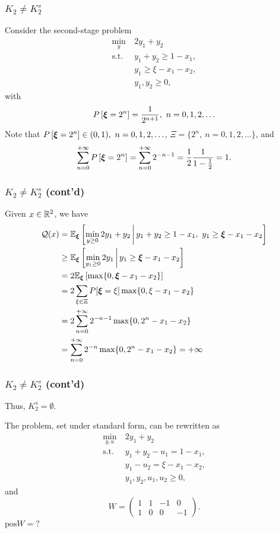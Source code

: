 \documentclass[aspectratio=169]{beamer}
\begin{document}
\begin{frame}
\frametitle{$K_2 \ne K_2^s$}

Consider the second-stage problem
\begin{align*}
	\min_y\ & 2y_1+y_2\\
	\mbox{s.t. } & y_1 + y_2 \geq 1 - x_1,\\
	& y_1 \geq \xi - x_1 - x_2,\\
	& y_1, y_2 \geq 0,
\end{align*}
with
$$
P\left[ \bsxi = 2^n \right] = \frac{1}{2^{n+1}},\ n = 0,1,2,\ldots
$$
Note that $P\left[ {\boldsymbol{\xi}} = 2^n \right] \in (0,1),\ n = 0,1,2,\ldots$, $\Xi = \lbrace 2^n,\ n = 0, 1, 2, \ldots \rbrace$, and
$$
\sum_{n=0}^{+\infty} P\left[ {\boldsymbol{\xi}} = 2^n \right] = \sum_{n=0}^{+\infty} 2^{-n-1} = \frac{1}{2} \frac{1}{1-\frac{1}{2}} = 1.
$$

\end{frame}

\begin{frame}
\frametitle{$K_2 \ne K_2^s$ (cont'd)}

Given $x \in {\mathbb{R}}^2$, we have
\begin{align*}
{\mathcal{Q}}(x) &= {\mathbb{E}}_{{\boldsymbol{\xi}}} \left[ \min_{y \geq 0} 2y_1+y_2 \,\bigg|\, y_1 + y_2 \geq 1 - x_1,\ y_1 \geq {\boldsymbol{\xi}} - x_1 - x_2 \right] \\
&\geq {\mathbb{E}}_{{\boldsymbol{\xi}}} \left[ \min_{y_1 \geq 0} 2y_1 \,\bigg|\, y_1 \geq {\boldsymbol{\xi}} - x_1 - x_2 \right] \\
& = 2 {\mathbb{E}}_{{\boldsymbol{\xi}}} \left[ \max \{ 0, {\boldsymbol{\xi}} - x_1 - x_2 \}\right] \\
& = 2 \sum_{\xi \in \Xi} P[{\boldsymbol{\xi}} = \xi] \max \{ 0, \xi - x_1 - x_2 \} \\
& = 2 \sum_{n = 0}^{+\infty} 2^{-n-1} \max \{ 0, 2^n - x_1 - x_2 \} \\
& = \sum_{n = 0}^{+\infty} 2^{-n} \max \{ 0, 2^n - x_1 - x_2 \} = +\infty
\end{align*}

\end{frame}

\begin{frame}
\frametitle{$K_2 \ne K_2^s$ (cont'd)}

Thus, $K_2^s = \emptyset$.

\mbox{}

The problem, set under standard form, can be rewritten as
\begin{align*}
	\min_{y,u}\ & 2y_1+y_2\\
	\mbox{s.t. } & y_1 + y_2 - u_1 = 1 - x_1,\\
	& y_1 -u_2 = \xi - x_1 - x_2,\\
	& y_1, y_2, u_1, u_2 \geq 0,
\end{align*}
and
$$
W = \begin{pmatrix}
 1 & 1 & -1 & 0 \\ 1 & 0 & 0 & -1
\end{pmatrix}.
$$
$\text{pos} W = ?$

\end{frame}
\end{document}
